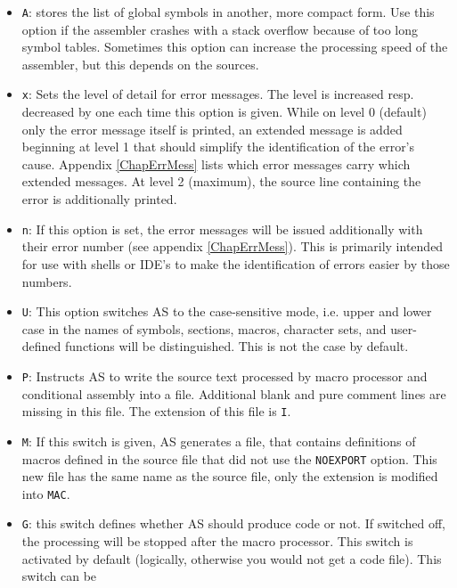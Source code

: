\documentclass[12pt,twoside]{report}
\newcommand{\tty}[1]{{\tt #1}}
\newcommand{\asname}{{AS}}
\begin{document}
\begin{itemize}
{      definitions, otherwise symbol names will be converted to upper
      case at this place!}
\item{\tty{A}: stores the list of global symbols in another, more compact
      form.  Use this option if the assembler crashes with a stack
      overflow because of too long symbol tables.  Sometimes this
      option can increase the processing speed of the assembler, but
      this depends on the sources.}
\item{\tty{x}: Sets the level of detail for error messages.  The level
      is increased resp. decreased by one each time this option is given.
      While on level 0 (default) only the error message itself is printed,
      an extended message is added beginning at level 1 that should
      simplify the identification of the error's cause.  Appendix
      \ref{ChapErrMess} lists which error messages carry which extended
      messages.  At level 2 (maximum), the source line containing the
      error is additionally printed.}
\item{\tty{n}: If this option is set, the error messages will be issued
      additionally with their error number (see appendix
      \ref{ChapErrMess}).  This is primarily intended for use with shells
      or IDE's to make the identification of errors easier by those
      numbers.}
\item{\tty{U}: This option switches \asname{} to the case-sensitive mode, i.e.
      upper and lower case in the names of symbols, sections, macros,
      character sets, and user-defined functions will be distinguished.
      This is not the case by default.}
\item{\tty{P}: Instructs \asname{} to write the source text processed by macro
      processor and conditional assembly into a file.  Additional
      blank and pure comment lines are missing in this file.  The
      extension of this file is \tty{I}.}
\item{\tty{M}: If this switch is given, \asname{} generates a file, that contains
      definitions of macros defined in the source file that did not
      use the \tty{NOEXPORT} option.  This new file has the same name as
      the source file, only the extension is modified into \tty{MAC}.}
\item{\tty{G}: this switch defines whether \asname{} should produce code or not.
      If switched off, the processing will be stopped after the macro
      processor. This switch is activated by default (logically,
      otherwise you would not get a code file). This switch can be
}
\end{itemize}
\end{document}
